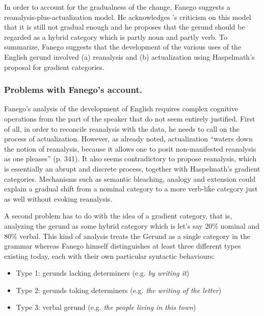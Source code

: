 In order to account for the gradualness of the change, Fanego suggests a reanalysis-plus-actualization model. He acknowledges \citet{haspelmath98does}'s criticism on this model that it is still not gradual enough and he proposes that the gerund should be regarded as a hybrid category which is partly noun and partly verb. To summarize, Fanego suggests that the development of the various uses of the English gerund involved (a) reanalysis and (b) actualization using Haspelmath's proposal for gradient categories. 


\subsubsection{Problems with Fanego's account.} 
Fanego's analysis of the development of English requires complex cognitive operations from the part of the speaker that do not seem entirely justified. First of all, in order to reconcile reanalysis with the data, he needs to call on the process of actualization. However, as \citet{haspelmath98does} already noted, actualization  ``waters down the notion of reanalysis, because it allows one to posit non-manifested reanalysis as one pleases''  (p. 341). It also seems contradictory to propose reanalysis, which is essentially an abrupt and discrete process, together with Haspelmath's gradient categories. Mechanisms such as semantic bleaching, analogy and extension could explain a gradual shift from a nominal category to a more verb-like category just as well without evoking reanalysis.

A second problem has to do with the idea of a gradient category, that is, analyzing the gerund as some hybrid category which is let's say 20\% nominal and 80\% verbal. This kind of analysis treats the Gerund as a single category in the grammar whereas Fanego himself distinguishes at least three different types existing today, each with their own particular syntactic behaviours:

\begin{itemize}
\item Type 1: gerunds lacking determiners (e.g. {\em by writing it})
\item Type 2: gerunds taking determiners (e.g. {\em the writing of the letter})
\item Type 3: verbal gerund (e.g. {\em the people living in this town})
\end{itemize}

